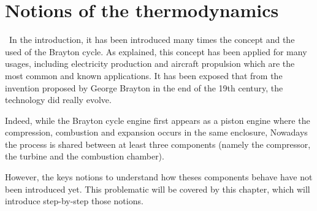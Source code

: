 \graphicspath{{Chapter_2_-_Notions_of_thermodynamics/Images/}}
\chapter{Notions of the thermodynamics}\label{Notions of thermo}
\quad\, In the introduction, it has been introduced many times the concept and the used of the Brayton cycle. As explained, this concept has been applied for many usages, including electricity production and aircraft propulsion which are the most common and known applications. It has been exposed that from the invention proposed by George Brayton in the end of the 19th century, the technology did really evolve.

Indeed, while the Brayton cycle engine first appears as a  piston engine where the compression, combustion and expansion occurs in the same enclosure, Nowadays 
the process is shared between at least three components (namely the compressor, the turbine and the combustion chamber).

However, the keys notions to understand how theses components behave have not been introduced yet. This problematic will be covered by this chapter, which will introduce step-by-step those notions.




%
%
